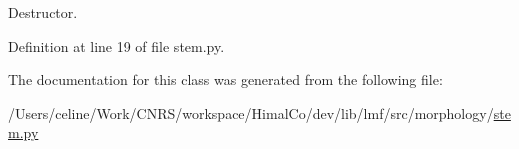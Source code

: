 Destructor. 



Definition at line 19 of file stem.\+py.



The documentation for this class was generated from the following file\+:\begin{DoxyCompactItemize}
\item 
/\+Users/celine/\+Work/\+C\+N\+R\+S/workspace/\+Himal\+Co/dev/lib/lmf/src/morphology/\hyperlink{stem_8py}{stem.\+py}\end{DoxyCompactItemize}

